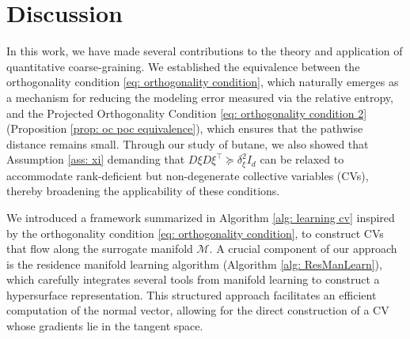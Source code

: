\documentclass[reqno, 12pt]{article}
\begin{document}
\section{Discussion}

In this work, we have made several %
contributions to the theory and application of quantitative coarse-graining. 
We established the equivalence between the orthogonality condition  \eqref{eq: orthogonality condition}, which naturally emerges as a mechanism for reducing the modeling error measured via the relative entropy, and the Projected Orthogonality Condition \eqref{eq: orthogonality condition 2} (Proposition \eqref{prop: oc poc equivalence}), which ensures that the pathwise distance remains small. Through our study of butane, we also showed that Assumption \ref{ass: xi} demanding that $D\xi D\xi^\top \succcurlyeq \delta_{\xi}^2I_d$ can be relaxed to accommodate rank-deficient but non-degenerate collective variables (CVs), thereby broadening the applicability of these conditions. 

We introduced a framework summarized in Algorithm \ref{alg: learning cv} inspired by the orthogonality condition  \eqref{eq: orthogonality condition}, to construct CVs that flow along the surrogate manifold $\mathcal{M}$. A crucial component of our approach is the residence manifold learning algorithm (Algorithm \ref{alg: ResManLearn}), which carefully integrates several tools from manifold learning to construct a hypersurface representation. This structured approach facilitates an efficient computation of the normal vector, allowing for the direct construction of a CV whose gradients lie in the tangent space. 
\end{document}
